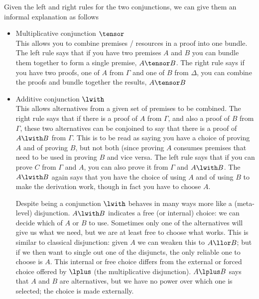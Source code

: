 Given the left and right rules for the two conjunctions, we can give them
an informal explanation as follows
\begin{itemize}
\item Multiplicative conjunction $\tensor$\\
This allows you to combine premises / resources in a proof into one
bundle.  The left rule says that if you have two premises $A$ and $B$
you can bundle them together to form a single premise, $A\tensor B$.
The right rule says if you have two proofs, one of $A$ from $\Gamma$ and
one of $B$ from $\Delta$, you can combine the proofs and bundle
together the results, $A\tensor B$
\item Additive conjunction $\lwith$\\
This allows alternatives from a given set of premises to be combined.
The right rule says  that if there is a proof of $A$ from $\Gamma$, and
also a proof of $B$ from $\Gamma$, these two alternatives can be conjoined
to say that there is a proof of $A\lwith B$ from $\Gamma$.  This is to be
read as saying you have a choice of proving  $A$ and of proving  $B$, but not
both (since proving $A$ consumes premises that need to be used in proving
$B$ and vice versa.  The left rule says that if you can prove $C$ from $\Gamma$
and $A$, you can also prove it from $\Gamma$ and $A\lwith B$.  The $A\lwith B$
again says that you have the choice of using $A$ and of using $B$ to make
the derivation work, though in fact you have to choose $A$.

Despite being a conjunction $\lwith$ behaves in many ways more like a 
(meta-level) disjunction.  $A\lwith B$ indicates a free (or internal) choice:
we can decide which of $A$ or $B$ to use.  Sometimes only one of the
alternatives will give us what we need, but we are at least free to choose what
works.  This is similar to classical disjunction: given $A$ we can weaken
this to $A\llor B$; but if we then want to single out one of the disjuncts,
the only reliable one to choose is $A$.   This internal or free choice
differs from the external or forced choice offered by $\lplus$ 
(the multiplicative disjunction).  $A\lplus B$ says that $A$ and $B$ are
alternatives, but we have no power over which one is selected; the choice
is made externally.  
\end{itemize}

